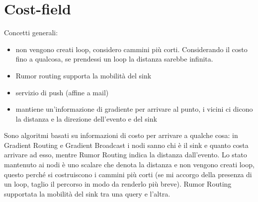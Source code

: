 \documentclass[12pt,italian]{report}
\begin{document}
\section{Cost-field}
\label{sec:cf}
Concetti generali:
\begin{itemize}
    \item non vengono creati loop, considero cammini più corti. Considerando il costo fino a qualcosa, se prendessi un loop la distanza sarebbe infinita.
    \item Rumor routing supporta la mobilità del sink
    \item servizio di push (affine a mail)
    \item mantiene un'informazione di gradiente per arrivare al punto, i vicini ci dicono la distanza e la direzione dell'evento e del sink
\end{itemize}

Sono algoritmi basati su informazioni di costo per arrivare a qualche cosa: in Gradient Routing e Gradient Broadcast i nodi sanno chi è il sink e quanto costa arrivare ad esso, mentre Rumor Routing indica la distanza dall'evento. Lo stato mantenuto ai nodi è uno scalare che denota la distanza e non vengono creati loop, questo perché si costruiscono i cammini più corti (se mi accorgo della presenza di un loop, taglio il percorso in modo da renderlo più breve). Rumor Routing supportata la mobilità del sink tra una query e l'altra. 
\bigbreak
\end{document}
